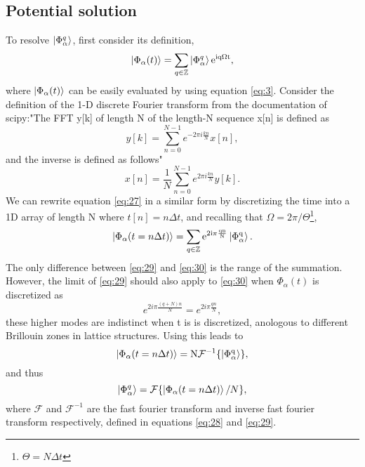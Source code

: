 \documentclass[10pt]{article}
\numberwithin{equation}{section}
\begin{document}
\subsection{Potential solution}
To resolve  $\ket{\Phi_{\alpha}^{q}}$, first consider its definition,
\begin{equation} \label{eq:27}
\ket{\Phi_{\alpha}(t)} = \sum_{q \in\mathbb{Z}}  \ket{\Phi_{\alpha}^{q}} \rm  e^{iq\Omega t},
\end{equation}
where $\ket{\Phi_{\alpha}(t)}$ can be easily evaluated by using equation \ref{eq:3}. Consider the definition of the 1-D discrete Fourier transform from the documentation of scipy:"The FFT y[k] of length N of the length-N sequence x[n] is defined as 
\begin{equation} \label{eq:28}
y[k] = \sum_{n=0}^{N-1}e^{-2\pi i \frac{kn}{N}}x[n],
\end{equation}
and the inverse is defined as follows"
\begin{equation} \label{eq:29}
x[n] = \frac{1}{N}\sum_{n=0}^{N-1}e^{2\pi i \frac{kn}{N}}y[k].
\end{equation}
We can rewrite equation \ref{eq:27} in a similar form by discretizing the time into a 1D array of length N where $t[n]=n\Delta t$, and recalling that $\Omega =2\pi/\Theta$\footnote{$\Theta=N\Delta t$},
\begin{equation} \label{eq:30}
\ket{\Phi_{\alpha}(t=n\Delta t)} = \sum_{q \in\mathbb{Z}} \rm  e^{2i\pi \frac{qn}{N}}\ket{\Phi_{\alpha}^{q}}.
\end{equation}
The only difference between \ref{eq:29} and \ref{eq:30} is the range of the summation. However, the limit of \ref{eq:29} should also apply to \ref{eq:30} when $\Phi_{\alpha}(t)$ is discretized as 
\begin{equation}
e^{2i\pi \frac{(q+N)n}{N}} = e^{2i\pi \frac{qn}{N}},
\end{equation} 
these higher modes are indistinct when t is is discretized, anologous to different Brillouin zones in lattice structures. Using this leads to 
\begin{equation}
\ket{\Phi_{\alpha}(t=n\Delta t)} =\rm N \mathcal{F}^{-1}\{\ket{\Phi_{\alpha}^{q}}\},
\end{equation}
and thus 
\begin{equation}
\ket{\Phi_{\alpha}^{q}} = \mathcal{F}\{\ket{\Phi_{\alpha}(t=n\Delta t)}/N\},
\end{equation}
where $\mathcal{F}$ and $\mathcal{F}^{-1}$ are the fast fourier transform and inverse fast fourier transform respectively, defined in equations \ref{eq:28} and \ref{eq:29}.
\end{document}
